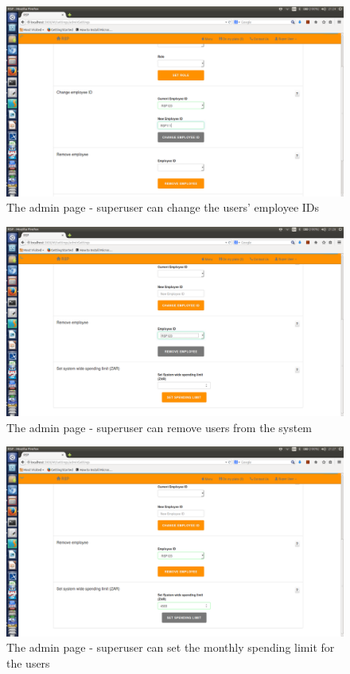 \documentclass[a4paper,12pt]{report}
\begin{document}
\begin{figure}[H]
  \centering
    \includegraphics[width=1.0\textwidth]{screenshots/changeEmplid.png}
    \caption{The admin page - superuser can change the users' employee IDs} 
\end{figure}

\begin{figure}[H]
  \centering
    \includegraphics[width=1.0\textwidth]{screenshots/removeUser.png}
    \caption{The admin page - superuser can remove users from the system} 
\end{figure}

\begin{figure}[H]
  \centering
    \includegraphics[width=1.0\textwidth]{screenshots/setLimit.png}
    \caption{The admin page - superuser can set the monthly spending limit for the users} 
\end{figure}
\end{document}
